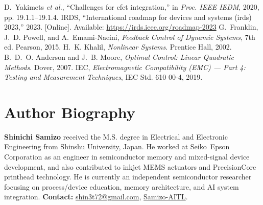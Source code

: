 \documentclass[conference]{IEEEtran}
\begin{document}
\begin{thebibliography}{6}
D.~Yakimets \emph{et al.}, ``Challenges for cfet integration,'' in \emph{Proc. IEEE IEDM}, 2020, pp. 19.1.1--19.1.4.
IRDS, ``International roadmap for devices and systems (irds) 2023,'' 2023. [Online]. Available: \url{https://irds.ieee.org/roadmap-2023}
G.~Franklin, J.~D. Powell, and A.~Emami-Naeini, \emph{Feedback Control of Dynamic Systems}, 7th ed. Pearson, 2015.
H.~K. Khalil, \emph{Nonlinear Systems}. Prentice Hall, 2002.
B.~D.~O. Anderson and J.~B. Moore, \emph{Optimal Control: Linear Quadratic Methods}. Dover, 2007.
IEC, \emph{Electromagnetic Compatibility (EMC) --- Part 4: Testing and Measurement Techniques}, IEC Std. 610 00-4, 2019.
\end{thebibliography}

\section*{Author Biography}
\noindent\textbf{Shinichi Samizo}
received the M.S. degree in Electrical and Electronic Engineering from Shinshu University, Japan. He worked at Seiko~Epson Corporation as an engineer in semiconductor memory and mixed-signal device development, and also contributed to inkjet MEMS actuators and PrecisionCore printhead technology. He is currently an independent semiconductor researcher focusing on process/device education, memory architecture, and AI system integration. \textbf{Contact:} \href{mailto:shin3t72@gmail.com}{shin3t72@gmail.com}, \href{https://github.com/Samizo-AITL}{Samizo-AITL}.
\end{document}

